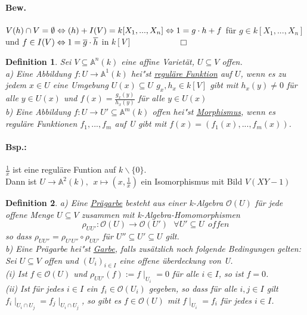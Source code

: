 \documentclass[a4paper,12pt]{report}
\theoremstyle{break}
\newtheorem{Def}{Definition}[chapter]
\theoremstyle{nonumberbreak}
\theoremstyle{nonumberplain}
\begin{document}
\paragraph{Bew.} $V(h)\cap V = \emptyset \Leftrightarrow (h)+I(V)=k[X_1,...,X_n]\\
\Leftrightarrow1=g\cdot h+f$ für $g\in k[X_1,...,X_n]$ und $f\in I(V)\\
\Leftrightarrow 1= \overline{g}\cdot\overline{h}$ in $k[V]~~~~~~~~~~~~~~~~~~~~~~~~~\Box$
\begin{Def}
Sei $V\subseteq\mathbb{A}^n(k)$ eine affine Varietät, $U\subseteq V$ offen.\\
a) Eine Abbildung $f: U\rightarrow \mathbb{A}^1(k)$ hei"st \underline{reguläre Funktion} auf $U$, wenn es zu jedem $x\in U$ eine Umgebung $U(x)\subseteq U$
$g_x,h_x\in k[V]$ gibt mit $h_x(y)\neq0$ für alle $y\in U(x)$ und $f(x)=\frac{g_x(y)}{h_x(y)}$ für alle $y\in U(x)$\\
b) Eine Abbildung $f: U\rightarrow U'\subseteq \mathbb{A}^m(k)$ offen hei"st \underline{Morphismus}, wenn es reguläre Funktionen $f_1,...,f_m$ auf U gibt mit $f(x)=(f_1(x),...,f_m(x))$.
\end{Def}
\paragraph{Bsp.:} $\frac{1}{x}$ ist eine reguläre Funtion auf $k\backslash\{0\}$.\\
Dann ist $U\rightarrow \mathbb{A}^2(k), ~~x\mapsto(x,\frac{1}{x})$ ein Isomorphismus mit Bild $V(XY-1)$
\begin{Def}
a) Eine \underline{Prägarbe} besteht aus einer k-Algebra $\mathcal{O}(U)$ für jede offene Menge $U\subseteq V$ zusammen mit k-Algebra-Homomorphismen
$$\rho_{UU'}: \mathcal{O}(U)\rightarrow \mathcal{O}(U') ~~~\forall U'\subseteq U~~offen$$
so dass $\rho_{UU''}=\rho_{U'U''}\circ\rho_{UU'}$ für $U''\subseteq U'\subseteq U$ gilt.\\
b) Eine Prägarbe hei"st \underline{Garbe}, falls zusätzlich noch folgende Bedingungen gelten:\\
Sei $U\subseteq V$ offen und $(U_i)_{i\in I}$ eine offene überdeckung von U.\\
(i) Ist $f\in \mathcal{O}(U)$ und $\rho_{UU'}(f):= f\mid_{U_i} = 0$ für alle $i\in I$, so ist $f=0$.\\
(ii) Ist für jedes $i\in I$ ein $f_i\in \mathcal{O}(U_i)$ gegeben, so dass für alle $i,j\in I$ gilt $f_i\mid_{U_i\cap U_j}=f_j\mid_{U_i\cap U_j}$, so gibt es $f\in \mathcal{O}(U)$ mit $f\mid_{U_i}=f_i$ für jedes $i\in I$.
\end{Def}
\end{document}
